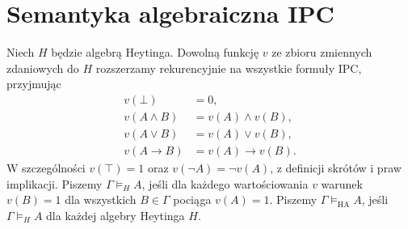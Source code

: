 \section{Semantyka algebraiczna IPC}

\begin{definicja}
\label{def:ncl-heyting-valuation}
Niech $H$ będzie algebrą Heytinga. Dowolną funkcję
$v$ ze zbioru zmiennych zdaniowych do $H$
rozszerzamy rekurencyjnie na wszystkie formuły IPC,
przyjmując
\[
\begin{aligned}
 v(\bot)&=0,\\
 v(A\wedge B)&=v(A)\wedge v(B),\\
 v(A\vee B)&=v(A)\vee v(B),\\
 v(A\to B)&=v(A)\to v(B).
\end{aligned}
\]
W szczególności $v(\top)=1$ oraz
$v(\neg A)=\neg v(A)$, z definicji skrótów
i praw implikacji.
Piszemy $\Gamma\models_H A$, jeśli dla każdego
wartościowania $v$ warunek $v(B)=1$ dla wszystkich
$B\in\Gamma$ pociąga $v(A)=1$.
Piszemy $\Gamma\models_{\mathrm{HA}} A$, jeśli
$\Gamma\models_H A$ dla każdej algebry Heytinga $H$.
\end{definicja}

